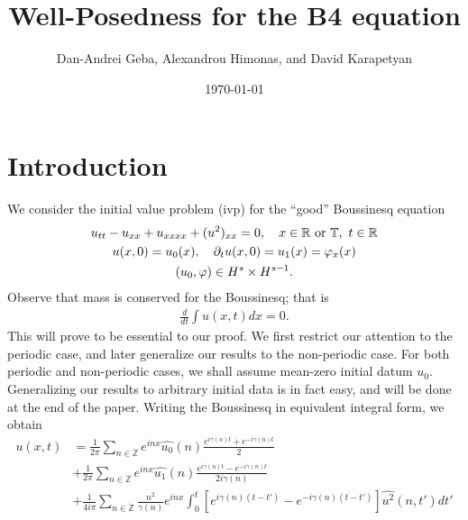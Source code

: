 \documentclass[12pt,reqno]{amsart}
\numberwithin{equation}{section}  %
\newcommand{\rr}{\mathbb{R}}
\newcommand{\zz}{\mathbb{Z}}
\newcommand{\ci}{\mathbb{T}}
\newcommand{\zzdot}{\dot{\zz}}
\newcommand{\wh}{\widehat}
\newcommand{\p}{\partial}
\newcommand{\vp}{\varphi}
\begin{document}
\title{Well-Posedness for the B4 equation}
\author{Dan-Andrei Geba, Alexandrou Himonas, and David Karapetyan}
\address{Department of Mathematics, University of Rochester, Rochester, NY 14627}
\address{Department of Mathematics, University of Notre Dame, Notre Dame, IN 46556}
\address{Department of Mathematics, University of Notre Dame, Notre Dame, IN 46556}
\date{\today}
\maketitle
\tableofcontents
\section{Introduction}
We consider the initial value problem (ivp) for the ``good'' Boussinesq 
equation 
\begin{gather}
u_{tt} - u_{xx} + u_{xxxx} + (u^2)_{xx} = 0, \quad x \in \rr \ \text{or} \
\ci, \ t \in \rr
\label{eqn:mb-2}
\\
u(x,0) = u_{0}(x), \quad \p_t u(x, 0) = u_{1}(x) = \vp_{x}(x)
\label{eqn:mb-init-data-2}
\\
\notag
(u_0, \vp) \in
H^{s}\times
H^{s-1}.
\end{gather}
Observe that mass is conserved for the Boussinesq; that is
\begin{equation*}
\begin{split}
\frac{d}{dt} \int u(x,t) dx = 0.
\end{split}
\end{equation*}
This will prove to be essential to our proof.  We first restrict our attention to the  periodic case, and later generalize our results to
the non-periodic case. For both periodic and non-periodic cases, we shall assume mean-zero initial datum $u_{0}$. Generalizing our results to arbitrary initial data is in fact easy, and will be done at the end of the paper. Writing the Boussinesq in equivalent integral form, we obtain 
\begin{equation}
\begin{split}
u(x,t)
& = \frac{1}{2\pi}\sum_{n \in \zzdot} e^{inx} \wh{u_{0}}(n) \frac{e^{i\gamma(n)t} + e^{-i\gamma(n)t}}{2} 
\\
& + \frac{1}{2 \pi}\sum_{n \in \zzdot} e^{inx}
\wh{u_{1}}(n)\frac{e^{i\gamma(n)t} - e^{-i\gamma(n)t}}{2 i \gamma(n)} 
\\
& + \frac{1}{4 i \pi}\sum_{n \in \zzdot} \frac{n^{2}}{\gamma(n)} e^{inx}
\int_{0}^{t}[e^{i\gamma(n)(t-t')}-e^{-i\gamma(n)(t-t')}]
\wh{u^{2}}(n, t') dt'
\end{split}
\label{eqn:integral-form}
\end{equation}
\end{document}
